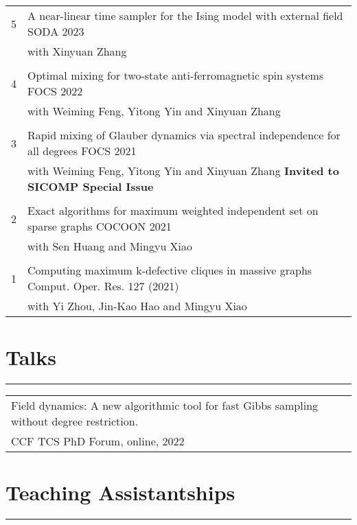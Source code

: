 \documentclass{article}
\begin{document}
\begin{tabularx}{\textwidth}{@{\hskip 0pt}lX@{\hskip 0pt}}
  5 & A near-linear time sampler for the Ising model with external field \hfill SODA 2023  \\
    & with Xinyuan Zhang \hfill \\
  \\
  4 & Optimal mixing for two-state anti-ferromagnetic spin systems \hfill FOCS 2022 \\
    & with Weiming Feng, Yitong Yin and Xinyuan Zhang \\
  \\
  3 & Rapid mixing of Glauber dynamics via spectral independence for all degrees \hfill FOCS 2021 \\
    & with Weiming Feng, Yitong Yin and Xinyuan Zhang \hfill \textbf{Invited to SICOMP Special Issue} \\
  \\
  2 & Exact algorithms for maximum weighted independent set on sparse graphs \hfill COCOON 2021 \\
    & with Sen Huang and Mingyu Xiao \\
  \\
  1 & Computing maximum k-defective cliques in massive graphs \hfill Comput. Oper. Res. 127 (2021) \\
    & with Yi Zhou, Jin-Kao Hao and Mingyu Xiao
\end{tabularx}

\section*{Talks}
\vspace{-1em} \hrule \vspace{1em}

\begin{tabularx}{\textwidth}{@{\hskip 0pt}lX@{\hskip 0pt}}
Field dynamics: A new algorithmic tool for fast Gibbs sampling without degree restriction. & \\
\hspace{20pt} CCF TCS PhD Forum, online, 2022
\end{tabularx}

\section*{Teaching Assistantships}
\vspace{-1em} \hrule \vspace{1em}
\end{document}
